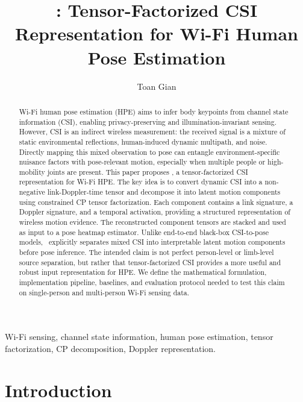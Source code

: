 \documentclass[10pt,journal]{IEEEtran}
\newcommand{\method}{\mathtt{DePose\mbox{-}Fi}}
\begin{document}
\title{\method: Tensor-Factorized CSI Representation for Wi-Fi Human Pose Estimation}

\author{Toan Gian}

\maketitle

\begin{abstract}
Wi-Fi human pose estimation (HPE) aims to infer body keypoints from channel state information (CSI), enabling privacy-preserving and illumination-invariant sensing. However, CSI is an indirect wireless measurement: the received signal is a mixture of static environmental reflections, human-induced dynamic multipath, and noise. Directly mapping this mixed observation to pose can entangle environment-specific nuisance factors with pose-relevant motion, especially when multiple people or high-mobility joints are present. This paper proposes \method, a tensor-factorized CSI representation for Wi-Fi HPE. The key idea is to convert dynamic CSI into a non-negative link-Doppler-time tensor and decompose it into latent motion components using constrained CP tensor factorization. Each component contains a link signature, a Doppler signature, and a temporal activation, providing a structured representation of wireless motion evidence. The reconstructed component tensors are stacked and used as input to a pose heatmap estimator. Unlike end-to-end black-box CSI-to-pose models, \method\ explicitly separates mixed CSI into interpretable latent motion components before pose inference. The intended claim is not perfect person-level or limb-level source separation, but rather that tensor-factorized CSI provides a more useful and robust input representation for HPE. We define the mathematical formulation, implementation pipeline, baselines, and evaluation protocol needed to test this claim on single-person and multi-person Wi-Fi sensing data.
\end{abstract}

\begin{IEEEkeywords}
Wi-Fi sensing, channel state information, human pose estimation, tensor factorization, CP decomposition, Doppler representation.
\end{IEEEkeywords}

\section{Introduction}
\end{document}
